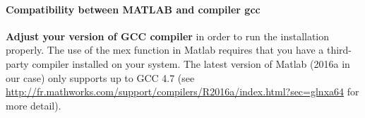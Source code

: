 \paragraph{Compatibility between MATLAB and compiler gcc} \textbf{Adjust your version of GCC compiler} in order to run the installation properly. The use of the mex function in Matlab requires that you have a third-party compiler installed on your system. The latest version of Matlab (2016a in our case) only supports up to GCC 4.7 (see \url{http://fr.mathworks.com/support/compilers/R2016a/index.html?sec=glnxa64} for more detail).
